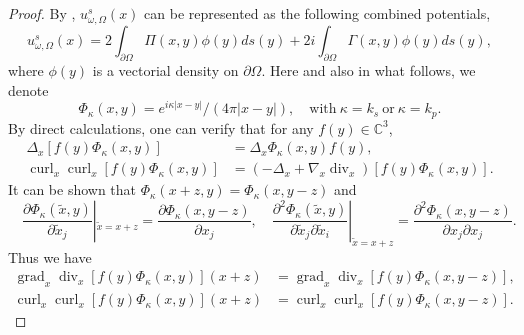 \documentclass[a4paper,11pt]{article}
\theoremstyle{remark}
\theoremstyle{definition}
\numberwithin{equation}{section}
\DeclareMathOperator{\curl}{curl}
\DeclareMathOperator{\Div}{div}
\DeclareMathOperator{\grad}{grad}
\begin{document}
 \begin{proof}
 By \cite{PH}, $ u_{\omega,\Omega}^s(x) $ can be represented as the following combined potentials,
 \begin{equation}
 u_{\omega,\Omega}^s(x) =  2\int_{\partial \Omega}\Pi(x,y) \phi(y)ds(y) + 2i  \int_{\partial \Omega} \Gamma(x,y) \phi(y)ds(y),
 \end{equation}
 where $\phi(y)$ is a vectorial density on $\partial \Omega$.
 Here and also in what follows, we denote
 \[
 \Phi_{\kappa}(x,y) = e^{i \kappa  |x-y|}/({4 \pi|x-y|}), \quad \text{with} \ \kappa = k_s \ \text{or} \ \kappa = k_p.
 \]
By direct calculations, one can verify that for any $f(y) \in \mathbb{C}^3$,
  \begin{align*}
  \Delta_{x}[f(y)\Phi_{\kappa}(x,y)] &= \Delta_{x}\Phi_{\kappa}(x,y) f(y), \\
  \curl_{x} \curl_{x} [f(y)\Phi_{\kappa}(x,y)] & = (-\Delta_{x} + \nabla_{x} \Div_{x})[f(y)\Phi_{\kappa}(x,y)].
  \end{align*}
  It can be shown that $ \Phi_{\kappa}(x+z,y) = \Phi_{\kappa}(x,y-z)$ and
  \[
  \quad \frac{\partial \Phi_{\kappa}(\tilde x,y)}{\partial \tilde x_{j}}|_{\tilde{x} = x+z} =   \frac{\partial \Phi_{\kappa}( x,y-z)}{\partial x_{j}},\quad   \frac{\partial^2 \Phi_{\kappa}(\tilde x,y)}{\partial \tilde x_{j}\partial \tilde x_{i}}|_{\tilde{x} = x+z} =   \frac{\partial^2 \Phi_{\kappa}( x,y-z)}{\partial x_{j}\partial x_{j}}.
  \]
  Thus we have
  \begin{equation}\label{eq:curl:trans}
  \begin{aligned}
  \grad_{x}\Div_{x}[f(y)\Phi_{\kappa}(x,y)](x+z) &=   \grad_{x}\Div_{x}[f(y)\Phi_{\kappa}(x,y-z)], \\
  \curl_{x} \curl_{x} [f(y)\Phi_{\kappa}(x,y)](x+z) & = \curl_{x} \curl_{x} [f(y)\Phi_{\kappa}(x,y-z)] .
  \end{aligned}
\end{equation}


\end{proof}
\end{document}

